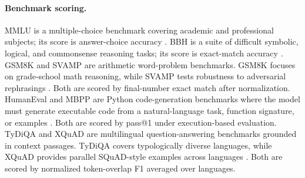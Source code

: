 \paragraph{Benchmark scoring.}
MMLU is a multiple-choice benchmark covering academic and professional
subjects; its score is answer-choice accuracy
\cite{hendrycks2021mmlu}. BBH is a suite of difficult symbolic, logical,
and commonsense reasoning tasks; its score is exact-match accuracy
\cite{suzgun2022bbh}. GSM8K and SVAMP are arithmetic word-problem benchmarks. GSM8K focuses on
grade-school math reasoning, while SVAMP tests robustness to adversarial
rephrasings \cite{cobbe2021gsm8k,patel2021svamp}. Both are scored by
final-number exact match after normalization. HumanEval and MBPP are Python code-generation benchmarks where the model
must generate executable code from a natural-language task, function
signature, or examples \cite{chen2021humaneval,austin2021mbpp}. Both are
scored by pass@1 under execution-based evaluation. TyDiQA and XQuAD are multilingual question-answering benchmarks grounded
in context passages. TyDiQA covers typologically diverse languages, while XQuAD provides parallel SQuAD-style examples across languages
\cite{clark2020tydiqa,artetxe2020xquad}. Both are scored by normalized
token-overlap F1 averaged over languages.



